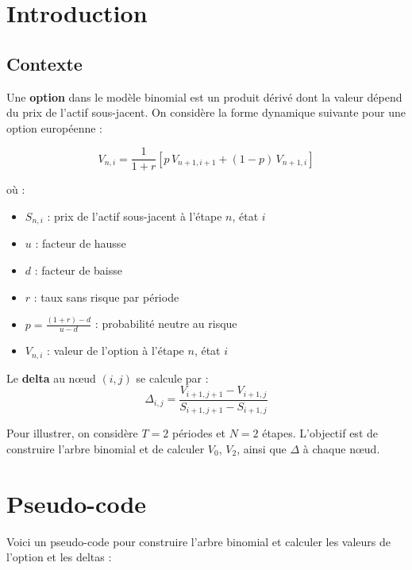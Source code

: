 \documentclass[12pt,a4paper]{report}
\begin{document}
\clearpage

\chapter*{Introduction}

\section*{Contexte}
Une \textbf{option} dans le modèle binomial est un produit dérivé dont la valeur dépend du prix de l'actif sous-jacent.  
On considère la forme dynamique suivante pour une option européenne :

\[
V_{n,i} = \frac{1}{1+r} \left[ p \, V_{n+1,i+1} + (1-p) \, V_{n+1,i} \right]
\]

où :  
\begin{itemize}
    \item $S_{n,i}$ : prix de l'actif sous-jacent à l'étape $n$, état $i$  
    \item $u$ : facteur de hausse  
    \item $d$ : facteur de baisse  
    \item $r$ : taux sans risque par période  
    \item $p = \frac{(1+r)-d}{u-d}$ : probabilité neutre au risque  
    \item $V_{n,i}$ : valeur de l'option à l'étape $n$, état $i$
\end{itemize}

Le \textbf{delta} au nœud $(i,j)$ se calcule par :  
\[
\Delta_{i,j} = \frac{V_{i+1,j+1} - V_{i+1,j}}{S_{i+1,j+1} - S_{i+1,j}}
\]

Pour illustrer, on considère $T=2$ périodes et $N=2$ étapes. L'objectif est de construire l'arbre binomial et de calculer $V_0$, $V_2$, ainsi que $\Delta$ à chaque nœud.  

\clearpage
\chapter*{Pseudo-code}

Voici un pseudo-code pour construire l'arbre binomial et calculer les valeurs de l'option et les deltas :
\end{document}
